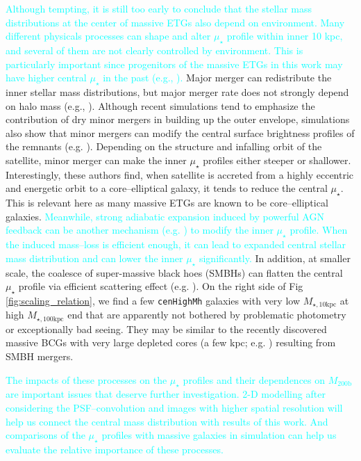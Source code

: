 \documentclass[a4paper,fleqn,usenatbib]{mnras}
\def\rbcg{\texttt{cenHighMh}}
\def\mhalo{{$M_{\mathrm{200b}}$}}
\def\minn{{$M_{\star,10\mathrm{kpc}}$}}
\def\mtot{{$M_{\star,100\mathrm{kpc}}$}}
\def\mden{{$\mu_{\star}$}}
\newcommand{\song}[1]{\textcolor{cyan}{#1}}
\begin{document}
    \song{ 
    Although tempting, it is still too early to conclude that the stellar mass 
    distributions at the center of massive ETGs also depend on environment. 
    Many different physicals processes can shape and alter \mden{} profile within 
    inner 10 kpc, and several of them are not clearly controlled by environment.
    This is particularly important since progenitors of the massive ETGs in this 
    work may have higher central \mden{} in the past (e.g., \citealt{Szomoru2012}).
    } 
    Major merger can redistribute the inner stellar mass distributions, but major
    merger rate does not strongly depend on halo mass (e.g., \citealt{Shankar2014}). 
    Although recent simulations tend to emphasize the contribution of dry minor 
    mergers in building up the outer envelope, simulations also show that minor 
    mergers can modify the central surface brightness profiles of the remnants
    (e.g. \citealt{BoylanKolchin2007}). 
    Depending on the structure and infalling orbit of the satellite, minor merger 
    can make the inner \mden{} profiles either steeper or shallower.  
    Interestingly, these authors find, when satellite is accreted from a highly 
    eccentric and energetic orbit to a core--elliptical galaxy, it tends to reduce 
    the central \mden{}.  
    This is relevant here as many massive ETGs are known to be core--elliptical 
    galaxies. 
    \song{
    Meanwhile, strong adiabatic expansion induced by powerful AGN feedback can 
    be another mechanism (e.g. \citealt{Fan2008}) to modify the inner \mden{}
    profile.
    When the induced mass--loss is efficient enough, it can lead to expanded 
    central stellar mass distribution and can lower the inner \mden{} significantly. 
    } 
    In addition, at smaller scale, the coalesce of super-massive black hoes (SMBHs)  
    can flatten the central \mden{} profile via efficient scattering effect 
    (e.g. \citealt{Milosavljevi2002}).
    On the right side of Fig \ref{fig:scaling_relation}, we find a few \rbcg{} 
    galaxies with very low \minn{} at high \mtot{} end that are apparently not bothered 
    by problematic photometry or exceptionally bad seeing.  
    They may be similar to the recently discovered massive BCGs with very large 
    depleted cores (a few kpc; e.g. \citealt{Postman2012, LopezCruz2014, Thomas2016,
    Bonfini2016}) resulting from SMBH mergers.
    
    \song{
    The impacts of these processes on the \mden{} profiles and their dependences 
    on \mhalo{} are important issues that deserve further investigation.  
    2-D modelling after considering the PSF--convolution and images with higher 
    spatial resolution will help us connect the central mass distribution with 
    results of this work. 
    And comparisons of the \mden{} profiles with massive galaxies in simulation can 
    help us evaluate the relative importance of these processes.
    }
\end{document}
